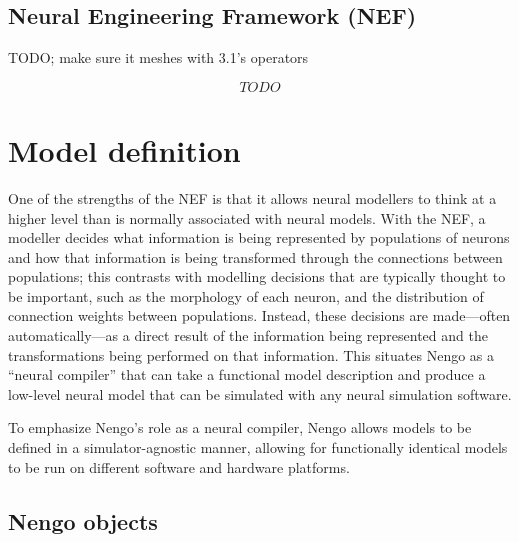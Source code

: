 \documentclass{frontiersSCNS}
\begin{document}
\subsection{Neural Engineering Framework (NEF)}

TODO; make sure it meshes with 3.1's operators

\begin{equation} \label{TODO}
  TODO
\end{equation}




\section{Model definition}

One of the strengths of the NEF
is that it allows neural modellers to think
at a higher level
than is normally associated with neural models.
With the NEF, a modeller decides
what information is being represented
by populations of neurons and how that information
is being transformed through the connections
between populations;
this contrasts with modelling decisions
that are typically thought to be important,
such as the morphology of each neuron,
and the distribution of connection weights
between populations.
Instead, these decisions are made---often
automatically---as a direct result
of the information
being represented and the transformations
being performed on that information.
This situates Nengo as a
``neural compiler'' that can
take a functional model description
and produce a low-level neural model
that can be simulated
with any neural simulation software.

To emphasize Nengo's role as a neural compiler,
Nengo allows models to be defined
in a simulator-agnostic manner,
allowing for functionally identical models to be run
on different software and hardware platforms.

\subsection{Nengo objects} \label{sec:objects}
\end{document}
